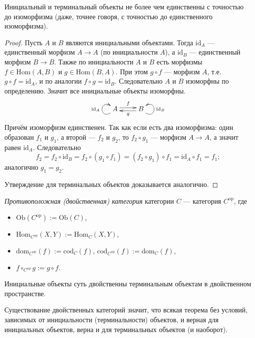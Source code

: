 \documentclass[12pt,a4paper]{article}
\newcommand{\op}{\mathrm{op}}
\newcommand{\Hom}{\mathrm{Hom}}
\newcommand{\dom}{\mathrm{dom}}
\newcommand{\cod}{\mathrm{cod}}
\newcommand{\Ob}{\mathrm{Ob}}
\newcommand{\id}{\mathrm{id}}
\begin{document}
    \begin{lemma}
        Инициальный и терминальный объекты не более чем единственны с точностью до изоморфизма (даже, точнее говоря, с точностью до единственного изоморфизма).
    \end{lemma}

    \begin{proof}
        Пусть $A$ и $B$ являются инициальными объектами. Тогда $\id_A$ --- единственный морфизм $A \to A$ (по инициальности $A$), а $\id_B$ --- единственный морфизм $B \to B$. Также по инициальности $A$ и $B$ есть морфизмы $f \in \Hom(A, B)$ и $g \in \Hom(B, A)$. При этом $g \circ f$ --- морфизм $A$, т.е. $g \circ f = \id_A$, и по аналогии $f \circ g = \id_B$. Следовательно $A$ и $B$ изоморфны по определению. Значит все инициальные объекты изоморфны.
        \[
            \xymatrix{
                A \ar@(dl,ul)[]^{\id_A} \ar@<0.5ex>[r]^{f} & B \ar@(dr,ur)[]_{\id_B} \ar@<0.5ex>[l]^{g}
            }
        \]
        Причём изоморфизм единственен. Так как если есть два изоморфизма: один образован $f_1$ и $g_1$, а второй --- $f_2$ и $g_2$, то $f_2 \circ g_1$ --- морфизм $A \to A$, а значит равен $\id_A$. Следовательно
        \[f_2 = f_2 \circ \id_B = f_2 \circ (g_1 \circ f_1) = (f_2 \circ g_1) \circ f_1 = \id_A \circ f_1 = f_1;\]
        аналогично $g_1 = g_2$.

        Утверждение для терминальных объектов доказывается аналогично.
    \end{proof}

    \begin{definition}
        \emph{Противоположная (двойственная) категория} категории $C$ --- категория $C^\op$, где
        \begin{itemize}
            \item $\Ob(C^\op) := \Ob(C)$,
            \item $\Hom_{C^\op}(X, Y) := \Hom_C(X, Y)$,
            \item $\dom_{C^\op}(f) := \cod_C(f)$, $\cod_{C^\op}(f) := \dom_C(f)$,
            \item $f \circ_{C^\op} g := g \circ f$.
        \end{itemize}
    \end{definition}

    \begin{remark*}
        Инициальные объекты суть двойственны терминальным объектам в двойственном пространстве.
        
        Существование двойственных категорий значит, что всякая теорема без условий, зависимых от инициальности (терминальности) объектов, и верная для инициальных объектов, верна и для терминальных объектов (и наоборот).
    \end{remark*}
\end{document}
